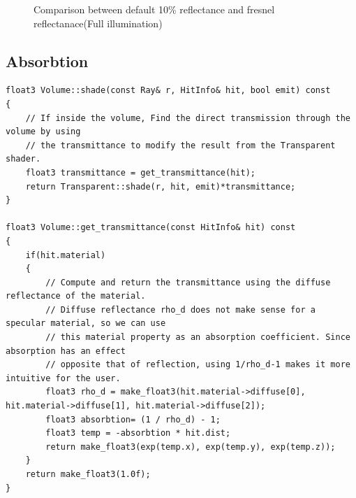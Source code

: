 \begin{figure}[H]
	\centering
	\qquad
	\captionsetup{justification=centering,margin=2cm}
	\caption{Comparison between default 10\% reflectance and fresnel reflectanace(Full illumination)}%
\end{figure}

\subsection{Absorbtion}

\begin{lstlisting}
float3 Volume::shade(const Ray& r, HitInfo& hit, bool emit) const
{
	// If inside the volume, Find the direct transmission through the volume by using
	// the transmittance to modify the result from the Transparent shader.
	float3 transmittance = get_transmittance(hit);
	return Transparent::shade(r, hit, emit)*transmittance;
}

float3 Volume::get_transmittance(const HitInfo& hit) const
{
	if(hit.material)
	{
		// Compute and return the transmittance using the diffuse reflectance of the material.
		// Diffuse reflectance rho_d does not make sense for a specular material, so we can use 
		// this material property as an absorption coefficient. Since absorption has an effect
		// opposite that of reflection, using 1/rho_d-1 makes it more intuitive for the user.
		float3 rho_d = make_float3(hit.material->diffuse[0], hit.material->diffuse[1], hit.material->diffuse[2]);
		float3 absorbtion= (1 / rho_d) - 1;
		float3 temp = -absorbtion * hit.dist;
		return make_float3(exp(temp.x), exp(temp.y), exp(temp.z));
	}
	return make_float3(1.0f);
}
\end{lstlisting}

